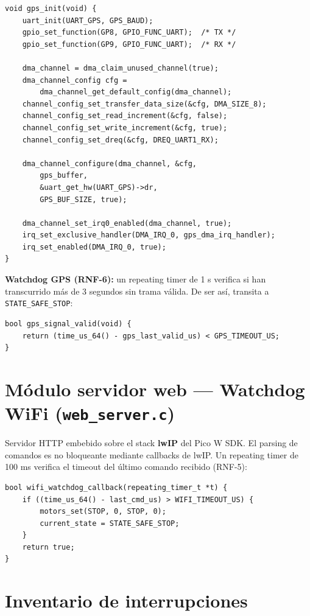 \documentclass[12pt]{report}
\begin{document}
\begin{lstlisting}[style=cstyle]
void gps_init(void) {
    uart_init(UART_GPS, GPS_BAUD);
    gpio_set_function(GP8, GPIO_FUNC_UART);  /* TX */
    gpio_set_function(GP9, GPIO_FUNC_UART);  /* RX */

    dma_channel = dma_claim_unused_channel(true);
    dma_channel_config cfg =
        dma_channel_get_default_config(dma_channel);
    channel_config_set_transfer_data_size(&cfg, DMA_SIZE_8);
    channel_config_set_read_increment(&cfg, false);
    channel_config_set_write_increment(&cfg, true);
    channel_config_set_dreq(&cfg, DREQ_UART1_RX);

    dma_channel_configure(dma_channel, &cfg,
        gps_buffer,
        &uart_get_hw(UART_GPS)->dr,
        GPS_BUF_SIZE, true);

    dma_channel_set_irq0_enabled(dma_channel, true);
    irq_set_exclusive_handler(DMA_IRQ_0, gps_dma_irq_handler);
    irq_set_enabled(DMA_IRQ_0, true);
}
\end{lstlisting}

\textbf{Watchdog GPS (RNF-6):} un repeating timer de 1 s verifica si han transcurrido más de 3 segundos sin trama válida. De ser así, transita a \texttt{STATE\_SAFE\_STOP}:

\begin{lstlisting}[style=cstyle]
bool gps_signal_valid(void) {
    return (time_us_64() - gps_last_valid_us) < GPS_TIMEOUT_US;
}
\end{lstlisting}
\newpage
\section{Módulo servidor web — Watchdog WiFi (\texttt{web\_server.c})}

Servidor HTTP embebido sobre el stack \textbf{lwIP} del Pico W SDK. El parsing de comandos es no bloqueante mediante callbacks de lwIP. Un repeating timer de 100 ms verifica el timeout del último comando recibido (RNF-5):

\begin{lstlisting}[style=cstyle]
bool wifi_watchdog_callback(repeating_timer_t *t) {
    if ((time_us_64() - last_cmd_us) > WIFI_TIMEOUT_US) {
        motors_set(STOP, 0, STOP, 0);
        current_state = STATE_SAFE_STOP;
    }
    return true;
}
\end{lstlisting}

\section{Inventario de interrupciones}
\end{document}
